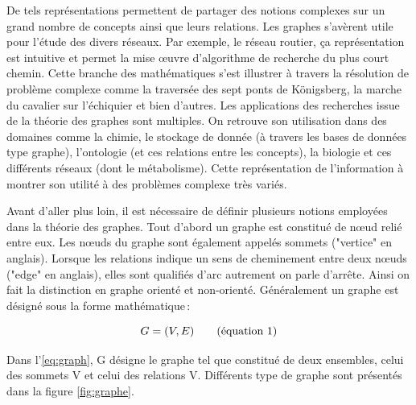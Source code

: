 \begin{refsegment}
    De tels représentations permettent de partager des notions complexes sur un grand nombre de concepts ainsi que leurs relations. Les graphes s'avèrent utile pour l'étude des divers réseaux. Par exemple, le réseau routier, ça représentation est intuitive et permet la mise œuvre d'algorithme de recherche du plus court chemin. Cette branche des mathématiques s'est illustrer à travers la résolution  de problème complexe comme la traversée des sept ponts de Königsberg, la marche du cavalier sur l’échiquier et bien d'autres. Les applications des recherches issue de la théorie des graphes sont multiples. On retrouve son utilisation dans des domaines comme la chimie, le stockage de donnée (à travers les bases de données type graphe), l'ontologie (et ces relations entre les concepts), la biologie et ces différents réseaux (dont le métabolisme). Cette représentation de l'information à montrer son utilité à des problèmes complexe très variés.
    
    Avant d'aller plus loin, il est nécessaire de définir plusieurs notions employées dans la théorie des graphes. Tout d'abord un graphe est constitué de nœud relié entre eux. Les nœuds du graphe sont également appelés sommets ("vertice" en anglais).  Lorsque les relations indique un sens de cheminement entre deux nœuds ("edge" en anglais), elles sont qualifiés d'arc autrement on parle d'arrête. Ainsi on fait la distinction en graphe orienté et non-orienté. Généralement un graphe est désigné sous la forme mathématique :
    
    \begin{equation}\label{eq:graph}
    	G = (V,E) \stepcounter{equation}\tag{équation \theequation}
    \end{equation}
    
    Dans l'\ref{eq:graph}, G désigne le graphe tel que constitué de deux ensembles, celui des sommets V et celui des relations V. Différents type de graphe sont présentés dans la figure  \ref{fig:graphe}.
    

\end{refsegment}
